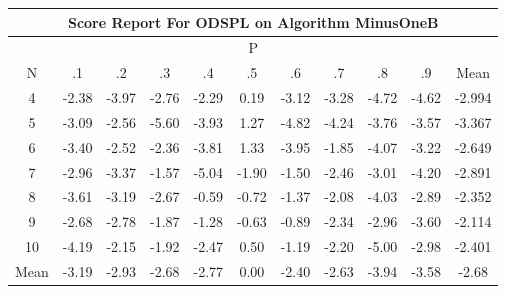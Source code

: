 \documentclass[11pt,a4paper]{report}
\begin{document}
\begin{longtable}{ | c || c | c | c | c | c | c | c | c | c || c |}
\hline
\multicolumn{11}{|c|}{ Score Report For ODSPL on Algorithm MinusOneB} \\
\hline
\multicolumn{11}{|c|}{ P } \\
\hline
N & .1 & .2 & .3 & .4 & .5 & .6 & .7 & .8 & .9 & Mean\\
 \hline
 \hline
 \endhead
  4 &  \cellcolor[HTML]{FFBFBF} -2.38 &  \cellcolor[HTML]{FF9F9F} -3.97 &  \cellcolor[HTML]{FFB7B7} -2.76 &  \cellcolor[HTML]{FFC7C7} -2.29 &  \cellcolor[HTML]{F7F7FF} 0.19 &  \cellcolor[HTML]{FFAFAF} -3.12 &  \cellcolor[HTML]{FFAFAF} -3.28 &  \cellcolor[HTML]{FF8787} -4.72 &  \cellcolor[HTML]{FF8787} -4.62 & -2.994 \\
  5 &  \cellcolor[HTML]{FFAFAF} -3.09 &  \cellcolor[HTML]{FFBFBF} -2.56 &  \cellcolor[HTML]{FF7070} -5.60 &  \cellcolor[HTML]{FF9F9F} -3.93 &  \cellcolor[HTML]{DFDFFF} 1.27 &  \cellcolor[HTML]{FF8787} -4.82 &  \cellcolor[HTML]{FF9797} -4.24 &  \cellcolor[HTML]{FF9F9F} -3.76 &  \cellcolor[HTML]{FFA7A7} -3.57 & -3.367 \\
  6 &  \cellcolor[HTML]{FFA7A7} -3.40 &  \cellcolor[HTML]{FFBFBF} -2.52 &  \cellcolor[HTML]{FFC7C7} -2.36 &  \cellcolor[HTML]{FF9F9F} -3.81 &  \cellcolor[HTML]{DFDFFF} 1.33 &  \cellcolor[HTML]{FF9F9F} -3.95 &  \cellcolor[HTML]{FFCFCF} -1.85 &  \cellcolor[HTML]{FF9797} -4.07 &  \cellcolor[HTML]{FFAFAF} -3.22 & -2.649 \\
  7 &  \cellcolor[HTML]{FFB7B7} -2.96 &  \cellcolor[HTML]{FFA7A7} -3.37 &  \cellcolor[HTML]{FFD7D7} -1.57 &  \cellcolor[HTML]{FF8080} -5.04 &  \cellcolor[HTML]{FFCFCF} -1.90 &  \cellcolor[HTML]{FFD7D7} -1.50 &  \cellcolor[HTML]{FFBFBF} -2.46 &  \cellcolor[HTML]{FFB7B7} -3.01 &  \cellcolor[HTML]{FF9797} -4.20 & -2.891 \\
  8 &  \cellcolor[HTML]{FFA7A7} -3.61 &  \cellcolor[HTML]{FFAFAF} -3.19 &  \cellcolor[HTML]{FFBFBF} -2.67 &  \cellcolor[HTML]{FFEFEF} -0.59 &  \cellcolor[HTML]{FFEFEF} -0.72 &  \cellcolor[HTML]{FFDFDF} -1.37 &  \cellcolor[HTML]{FFC7C7} -2.08 &  \cellcolor[HTML]{FF9797} -4.03 &  \cellcolor[HTML]{FFB7B7} -2.89 & -2.352 \\
  9 &  \cellcolor[HTML]{FFBFBF} -2.68 &  \cellcolor[HTML]{FFB7B7} -2.78 &  \cellcolor[HTML]{FFCFCF} -1.87 &  \cellcolor[HTML]{FFDFDF} -1.28 &  \cellcolor[HTML]{FFEFEF} -0.63 &  \cellcolor[HTML]{FFE7E7} -0.89 &  \cellcolor[HTML]{FFC7C7} -2.34 &  \cellcolor[HTML]{FFB7B7} -2.96 &  \cellcolor[HTML]{FFA7A7} -3.60 & -2.114 \\
  10 &  \cellcolor[HTML]{FF9797} -4.19 &  \cellcolor[HTML]{FFC7C7} -2.15 &  \cellcolor[HTML]{FFCFCF} -1.92 &  \cellcolor[HTML]{FFBFBF} -2.47 &  \cellcolor[HTML]{EFEFFF} 0.50 &  \cellcolor[HTML]{FFDFDF} -1.19 &  \cellcolor[HTML]{FFC7C7} -2.20 &  \cellcolor[HTML]{FF8080} -5.00 &  \cellcolor[HTML]{FFB7B7} -2.98 & -2.401 \\
 \hline
 \hline
Mean &  \cellcolor[HTML]{FFAFAF} -3.19 &  \cellcolor[HTML]{FFB7B7} -2.93 &  \cellcolor[HTML]{FFBFBF} -2.68 &  \cellcolor[HTML]{FFB7B7} -2.77 &  \cellcolor[HTML]{FFFFFF} 0.00 &  \cellcolor[HTML]{FFBFBF} -2.40 &  \cellcolor[HTML]{FFBFBF} -2.63 &  \cellcolor[HTML]{FF9F9F} -3.94 &  \cellcolor[HTML]{FFA7A7} -3.58 &  \cellcolor[HTML]{FFBFBF} -2.68
\end{longtable}
\end{document}
